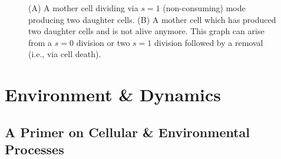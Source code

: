 \begin{figure}
    \centering
    \caption[Two modes of Cell Division]{
        (A) A mother cell dividing via $s=1$ (non-consuming) mode producing two daughter cells.
        (B) A mother cell which has produced two daughter cells and is not alive anymore.
        This graph can arise from a $s=0$ division or two $s=1$ division followed by a removal (i.e.,
        via cell death).
    }
    \label{fig:cell-lineage-misleading-graphs}
\end{figure}

\section{Environment \& Dynamics}
\label{section:dynamics}


\subsection{A Primer on Cellular \& Environmental Processes}
\label{subsection:dynamics-primer-cellular-environmental-processes}

